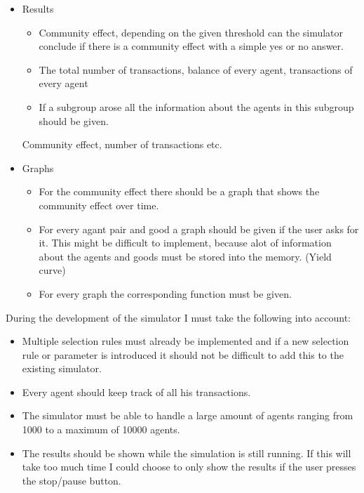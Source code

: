 \documentclass{article}
\begin{document}
\begin{itemize}
  \item Results
	\begin{itemize}
 		 \item Community effect, depending on the given threshold can the simulator conclude if there is a community effect with a simple yes or no answer.
 		 \item The total number of transactions, balance of every agent, transactions of every agent
		 \item If a subgroup arose all the information about the agents in this subgroup should be given.
	\end{itemize} Community effect, number of transactions etc.
  \item Graphs
	\begin{itemize}
 		 \item For the community effect there should be a graph that shows the community effect over time.
 		 \item For every agant pair and good a graph should be given if the user asks for it. This might be difficult to implement, because alot of information about the agents and goods must be stored into the memory. (Yield curve)
		\item For every graph the corresponding function must be given.
	\end{itemize} 
\end{itemize}

During the development of the simulator I must take the following into account:
\begin{itemize}
  \item Multiple selection rules must already be implemented and if a new selection rule or parameter is introduced it should not be difficult to add this to the existing simulator.
 \item Every agent should keep track of all his transactions.
  \item The simulator must be able to handle a large amount of agents ranging from 1000 to a maximum of 10000 agents. 
  \item The results should be shown while the simulation is still running. If this will take too much time I could choose to only show the results if the user presses the stop/pause button.
\end{itemize}
\end{document}
